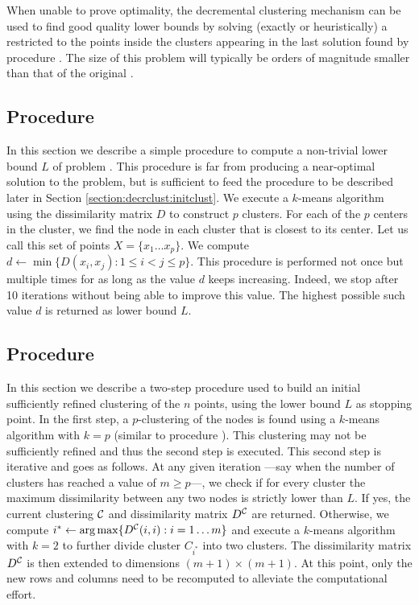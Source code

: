 \documentclass[ijoo,nonblindrev]{informs-ijoo}
\begin{document}
\begin{remark}\label{remark}
When unable to prove optimality, the decremental clustering mechanism can be used to find good quality lower bounds by solving (exactly or heuristically) a \pDP{} restricted to the points inside the clusters appearing in the last solution found by procedure . The size of this problem will typically be orders of magnitude smaller than that of the original \pDP{}.%
\end{remark}

\subsection{Procedure \label{section:decrclust:hpdp}}

In this section we describe a simple procedure to compute a non-trivial lower bound $L$ of problem . This procedure is far from producing a near-optimal solution to the problem, but is sufficient to feed the procedure  to be described later in Section \ref{section:decrclust:initclust}. We execute a $k$-means algorithm using the dissimilarity matrix $D$ to construct $p$ clusters. For each of the $p$ centers in the cluster, we find the node in each cluster that is closest to its center. Let us call this set of points $X = \{x_1\ldots x_p\}$. We compute $d\leftarrow \min\{D(x_i, x_j): 1\leq i < j \leq p\}$. This procedure is performed not once but multiple times for as long as the value $d$ keeps increasing. Indeed, we stop after 10 iterations without being able to improve this value. The highest possible such value $d$ is returned as lower bound $L$.

\subsection{Procedure \label{section:decrclust:initclust}}

In this section we describe a two-step procedure used to build an initial sufficiently refined clustering of the $n$ points, using the lower bound $L$ as stopping point. In the first step, a $p$-clustering of the nodes is found using a $k$-means algorithm with $k = p$ (similar to procedure ). This clustering may not be sufficiently refined and thus the second step is executed. This second step is iterative and goes as follows. At any given iteration ---say when the number of clusters has reached a value of $m \geq p$---, we check if for every cluster the maximum dissimilarity between any two nodes is strictly lower than $L$. If yes, the current clustering $\mathcal{C}$ and dissimilarity matrix $D^{\mathcal{C}}$ are returned. Otherwise, we compute $i^*\leftarrow\arg\max\{D^{\mathcal{C}}(i, i): i = 1\ldots m\}$ and execute a $k$-means algorithm with $k = 2$ to further divide cluster $C_{i^*}$ into two clusters. The dissimilarity matrix $D^{\mathcal{C}}$ is then extended to dimensions $(m + 1)\times (m + 1)$. At this point, only the new rows and columns need to be recomputed to alleviate the computational effort.
\end{document}

